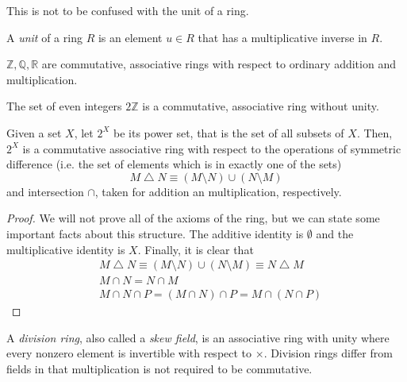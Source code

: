 \documentclass{article}
\begin{document}
    This is not to be confused with the unit of a ring. 

    \begin{definition}
      A \textit{unit} of a ring $R$ is an element $u \in R$ that has a multiplicative inverse in $R$. 
    \end{definition}

    \begin{example}
      $\mathbb{Z}, \mathbb{Q}, \mathbb{R}$ are commutative, associative rings with respect to ordinary addition and multiplication.
    \end{example}

    \begin{example}
      The set of even integers $2\mathbb{Z}$ is a commutative, associative ring without unity.
    \end{example}

    \begin{proposition}
      Given a set $X$, let $2^X$ be its power set, that is the set of all subsets of $X$. Then, $2^X$ is a commutative associative ring with respect to the operations of symmetric difference (i.e. the set of elements which is in exactly one of the sets) 
      \begin{equation}
        M \bigtriangleup N \equiv (M \setminus N) \cup (N \setminus M)
      \end{equation}
      and intersection $\cap$, taken for addition an multiplication, respectively. 
    \end{proposition}
    \begin{proof}
      We will not prove all of the axioms of the ring, but we can state some important facts about this structure. The additive identity is $\emptyset$ and the multiplicative identity is $X$. Finally, it is clear that 
      \begin{align*}
        & M \bigtriangleup N \equiv (M \setminus N) \cup (N \setminus M) \equiv N \bigtriangleup M \\
        & M \cap N = N \cap M \\
        & M \cap N \cap P = (M \cap N) \cap P = M \cap (N \cap P)
      \end{align*}
    \end{proof}

    \begin{example}
      A \textit{division ring}, also called a \textit{skew field}, is an associative ring with unity where every nonzero element is invertible with respect to $\times$. Division rings differ from fields in that multiplication is not required to be commutative. 
    \end{example}
\end{document}
